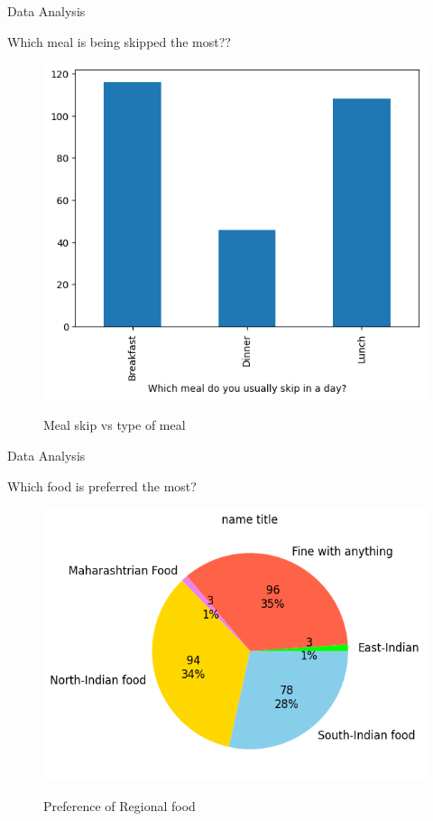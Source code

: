 \documentclass{beamer}
\begin{document}
\begin{frame}{Data Analysis}
\begin{block}{Which meal is being skipped the most??}
\begin{figure}
      \centering
    \caption{Meal skip vs type of meal }
    \includegraphics[scale = 0.5]{bar_timing_skip.png}  
    \label{bar_timing_skip}
\end{figure}
\end{block}
\end{frame}
\begin{frame}{Data Analysis}
\begin{block}{Which food is preferred the most?}
\begin{figure}
      \centering
    \caption{ Preference of Regional food}
    \includegraphics[scale = 0.55]{pie_food_pref.png}  
    \label{pie_food_pref}
\end{figure}
\end{block}
\end{frame}
\end{document}
